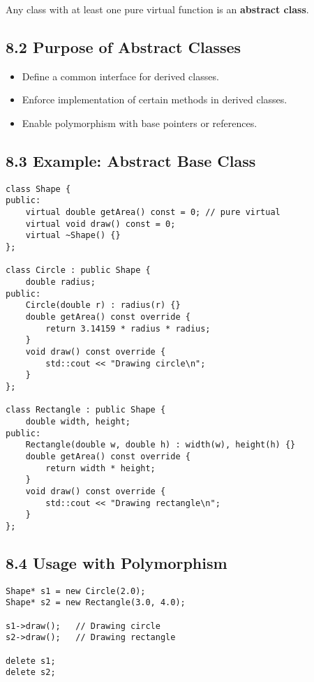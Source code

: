 \documentclass{article}
\begin{document}
Any class with at least one pure virtual function is an \textbf{abstract class}.

\subsection*{8.2 Purpose of Abstract Classes}

\begin{itemize}
    \item Define a common interface for derived classes.
    \item Enforce implementation of certain methods in derived classes.
    \item Enable polymorphism with base pointers or references.
\end{itemize}

\subsection*{8.3 Example: Abstract Base Class}

\begin{lstlisting}[style=cppstyle]
class Shape {
public:
    virtual double getArea() const = 0; // pure virtual
    virtual void draw() const = 0;
    virtual ~Shape() {}
};

class Circle : public Shape {
    double radius;
public:
    Circle(double r) : radius(r) {}
    double getArea() const override {
        return 3.14159 * radius * radius;
    }
    void draw() const override {
        std::cout << "Drawing circle\n";
    }
};

class Rectangle : public Shape {
    double width, height;
public:
    Rectangle(double w, double h) : width(w), height(h) {}
    double getArea() const override {
        return width * height;
    }
    void draw() const override {
        std::cout << "Drawing rectangle\n";
    }
};
\end{lstlisting}

\subsection*{8.4 Usage with Polymorphism}

\begin{lstlisting}[style=cppstyle]
Shape* s1 = new Circle(2.0);
Shape* s2 = new Rectangle(3.0, 4.0);

s1->draw();   // Drawing circle
s2->draw();   // Drawing rectangle

delete s1;
delete s2;
\end{lstlisting}
\end{document}
